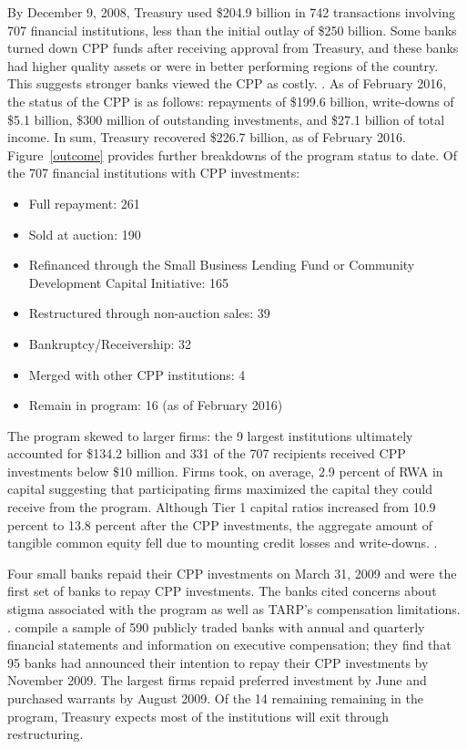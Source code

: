 \documentclass[12pt]{article}
\begin{document}
By December 9, 2008, Treasury used \$204.9 billion in 742 transactions involving 707 financial institutions, less than the initial outlay of \$250 billion. Some banks turned down CPP funds after receiving approval from Treasury, and these banks had higher quality assets or were in better performing regions of the country. This suggests stronger banks viewed the CPP as costly. \citep{Ba}. As of February 2016, the status of the CPP is as follows: repayments of \$199.6 billion, write-downs of \$5.1 billion, \$300 million of outstanding investments, and \$27.1 billion of total income. In sum, Treasury recovered \$226.7 billion, as of February 2016.  Figure~\ref{outcome} provides further breakdowns of the program status to date. Of the 707 financial institutions with CPP investments: 
\begin{itemize}[label={--}]
\item Full repayment: 261 
\item Sold at auction: 190 
\item Refinanced through the Small Business Lending Fund or Community Development Capital Initiative: 165 
\item Restructured through non-auction sales: 39 
\item Bankruptcy/Receivership: 32 
\item Merged with other CPP institutions: 4
\item Remain in program: 16 (as of February 2016)
\end{itemize}
\citep{GAO}
The program skewed to larger firms: the 9 largest institutions ultimately accounted for \$134.2 billion and 331 of the 707 recipients received CPP investments below \$10 million. Firms took, on average, 2.9 percent of RWA in capital suggesting that participating firms maximized the capital they could receive from the program. Although Tier 1 capital ratios increased from 10.9 percent to 13.8 percent after the CPP investments, the aggregate amount of tangible common equity fell due to mounting credit losses and write-downs. \citep{Ba}. 

Four small banks repaid their CPP investments on March 31, 2009 and were the first set of banks to repay CPP investments. The banks cited concerns about stigma associated with the program as well as TARP's compensation limitations. \citep{SmallRepay}. \citet{Ba} compile a sample of 590 publicly traded banks with annual and quarterly financial statements and information on executive compensation; they find that 95 banks had announced their intention to repay their CPP investments by November 2009. The largest firms repaid preferred investment by June and purchased warrants by August 2009. Of the 14 remaining remaining in the program, Treasury expects most of the institutions will exit through restructuring. 
\end{document}
